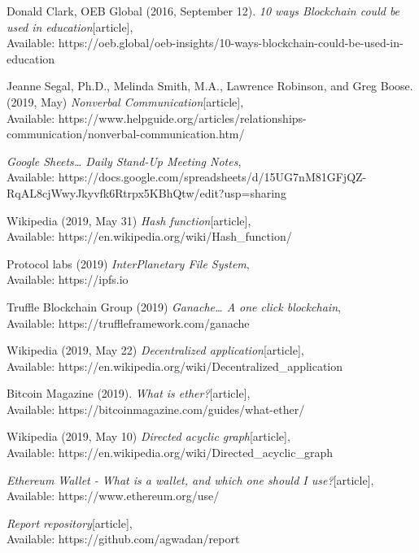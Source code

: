 \begin{thebibliography}{20}
Donald Clark, OEB Global (2016, September 12).
\emph{10 ways Blockchain could be used in education}[article],\\
Available: {https://oeb.global/oeb-insights/10-ways-blockchain-could-be-used-in-education}

  Jeanne Segal, Ph.D., Melinda Smith, M.A., Lawrence Robinson, and Greg Boose. (2019, May)
\emph{Nonverbal Communication}[article],\\
Available: {https://www.helpguide.org/articles/relationships-communication/nonverbal-communication.htm/}

\emph{Google Sheets… Daily Stand-Up Meeting Notes},\\
Available: {https://docs.google.com/spreadsheets/d/15UG7nM81GFjQZ-RqAL8cjWwyJkyvfk6Rtrpx5KBhQtw/edit?usp=sharing}

 Wikipedia (2019, May 31)
\emph{Hash function}[article],\\
Available: {https://en.wikipedia.org/wiki/Hash\_function/}

Protocol labs (2019)
\emph{InterPlanetary File System},\\
Available: {https://ipfs.io}

 Truffle Blockchain Group (2019)
\emph{Ganache… A one click blockchain},\\
Available: {https://truffleframework.com/ganache}

 Wikipedia (2019, May 22)
\emph{Decentralized application}[article],\\
Available: {https://en.wikipedia.org/wiki/Decentralized\_application}

 Bitcoin Magazine (2019).
\emph{What is ether?}[article],\\
Available: {https://bitcoinmagazine.com/guides/what-ether/}

Wikipedia (2019, May 10)
\emph{Directed acyclic graph}[article],\\
Available: {https://en.wikipedia.org/wiki/Directed\_acyclic\_graph}

\emph{Ethereum Wallet - What is a wallet, and which one should I use?}[article],\\
Available: {https://www.ethereum.org/use/}

\emph{Report repository}[article],\\
Available: {https://github.com/agwadan/report}

\end{thebibliography}

